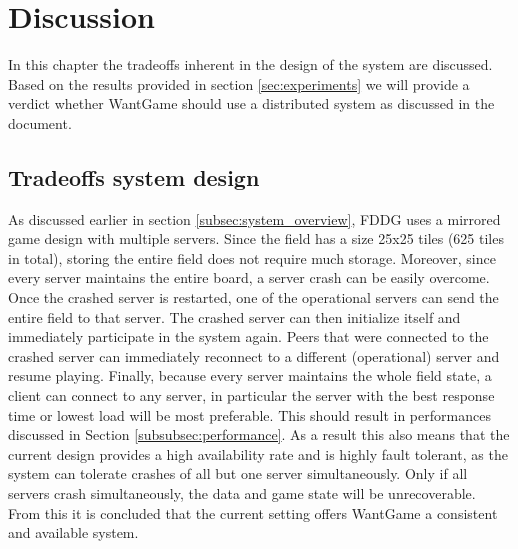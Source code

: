 \section{Discussion}
\label{sec:discussion}


	In this chapter the tradeoffs inherent in the design of the system are discussed. Based on the results provided in section \ref{sec:experiments} we will provide a verdict whether WantGame should use a distributed system as discussed in the document.
	
	
	\subsection{Tradeoffs system design}
	\label{subsec:tradeoffs_system_design}
		As discussed earlier in section \ref{subsec:system_overview}, FDDG uses a mirrored game design with multiple servers. 
		Since the field has a size 25x25 tiles (625 tiles in total), storing the entire field does not require much storage. 
		Moreover, since every server maintains the entire board, a server crash can be easily overcome.
		Once the crashed server is restarted, one of the operational servers can send the entire field to that server. 
		The crashed server can then initialize itself and immediately participate in the system again. 
		Peers that were connected to the crashed server can immediately reconnect to a different (operational) server and resume playing.
		Finally, because every server maintains the whole field state, a client can connect to any server, in particular the server with the best response time or lowest load will be most preferable.
		This should result in performances discussed in Section \ref{subsubsec:performance}.
		As a result this also means that the current design provides a high availability rate and is highly fault tolerant, as the system can tolerate crashes of all but one server simultaneously. 
		Only if all servers crash simultaneously, the data and game state will be unrecoverable.
		From this it is concluded that the current setting offers WantGame a consistent and available system. 
		
